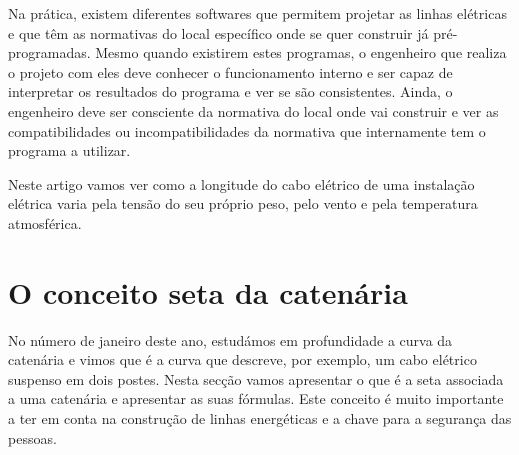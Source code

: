 Na prática, existem diferentes softwares que permitem projetar as linhas elétricas e que têm as normativas do local específico onde se quer construir já pré-programadas. Mesmo quando existirem estes programas, o engenheiro que realiza o projeto com eles deve conhecer o funcionamento interno e ser capaz de interpretar os resultados do programa e ver se são consistentes. Ainda, o engenheiro deve ser consciente da normativa do local onde vai construir e ver as compatibilidades ou incompatibilidades da normativa que internamente tem o programa a utilizar.

Neste artigo vamos ver como a longitude do cabo elétrico de uma instalação elétrica varia pela tensão do seu próprio peso, pelo vento e pela temperatura atmosférica.


\section{O conceito seta da catenária}
\label{sec:parabola-vs-catenara}

No número de janeiro deste ano, estudámos em profundidade a curva da catenária e vimos que é a curva que descreve, por exemplo, um cabo elétrico suspenso em dois postes. Nesta secção vamos apresentar o que é a seta associada a uma catenária e apresentar as suas fórmulas. Este conceito é muito importante a ter em conta na construção de linhas energéticas e a chave para a segurança das pessoas.

